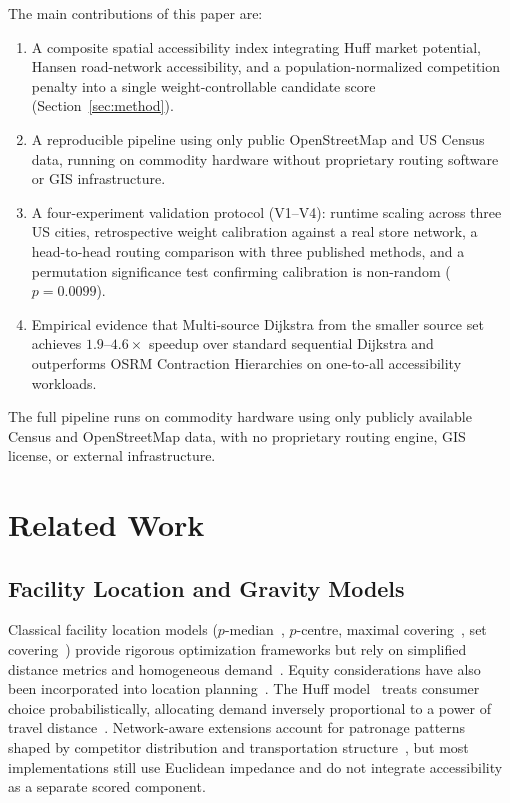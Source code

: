 \documentclass[conference]{IEEEtran}
\begin{document}
The main contributions of this paper are:
\begin{enumerate}
    \item A composite spatial accessibility index integrating Huff
    market potential, Hansen road-network accessibility, and a
    population-normalized competition penalty into a single
    weight-controllable candidate score (Section~\ref{sec:method}).
    \item A reproducible pipeline using only public OpenStreetMap
    and US Census data, running on commodity hardware without
    proprietary routing software or GIS infrastructure.
    \item A four-experiment validation protocol (V1--V4): runtime
    scaling across three US cities, retrospective weight calibration
    against a real store network, a head-to-head routing comparison
    with three published methods, and a permutation significance test
    confirming calibration is non-random ($p = 0.0099$).
    \item Empirical evidence that Multi-source Dijkstra from the
    smaller source set achieves $1.9$--$4.6\times$ speedup over
    standard sequential Dijkstra and outperforms OSRM Contraction
    Hierarchies on one-to-all accessibility workloads.
\end{enumerate}

The full pipeline runs on commodity hardware using only publicly
available Census and OpenStreetMap data, with no proprietary routing
engine, GIS license, or external infrastructure.

\section{Related Work}

\subsection{Facility Location and Gravity Models}

Classical facility location models ($p$-median~\cite{Hakimi1964},
$p$-centre, maximal covering~\cite{Church1974}, set
covering~\cite{Toregas1971}) provide rigorous
optimization frameworks but rely on simplified distance metrics and
homogeneous demand~\cite{ReVelle2005, Owen1998, Farahani2012,
Drezner2024}.  Equity considerations have also been incorporated into
location planning~\cite{Morrill1977}.  The Huff
model~\cite{Huff1964} treats consumer choice probabilistically,
allocating demand inversely proportional to a power of travel
distance~\cite{Wilson1971, Nakanishi1974, Fotheringham1983,
Suhara2019, Liang2020}.  Network-aware extensions account for
patronage patterns shaped by competitor distribution and transportation
structure~\cite{Sevtsuk2017, Verhetsel2022}, but most implementations
still use Euclidean impedance and do not integrate accessibility as a
separate scored component.
\end{document}
